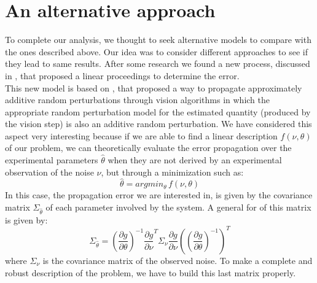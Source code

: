 \section{An alternative approach}

To complete our analysis, we thought to seek alternative models to compare with the ones described above. Our idea was to consider different approaches to see if they lead to same results. After some research we found a new process, discussed in \cite{7520324}, that proposed a linear proceedings to determine the error. \\

This new model is based on \cite{576335}, that proposed a way to propagate approximately additive random perturbations through vision algorithms in which the appropriate random perturbation model for the estimated quantity (produced by the vision step) is also an additive random perturbation. We have considered this aspect very interesting because if we are able to find a linear description $f(\nu, \theta)$ of our problem, we can theoretically evaluate the error propagation over the experimental parameters $\hat{\theta}$ when they are not derived by an experimental observation of the noise $\nu$, but through a minimization such as:
  \begin{equation*}
    \hat{\theta} = argmin_{\theta} \, f(\nu, \theta)
  \end{equation*}
In this case, the propagation error we are interested in, is given by the covariance matrix $\Sigma_{\hat{\theta}}$ of each parameter involved by the system. A general for of this matrix is given by:
  \begin{equation*}
    \Sigma_{\hat{\theta}} =
      \left( \frac{\partial g}{\partial \theta} \right)^{-1}
      \frac{\partial g}{\partial \nu}^T
      \Sigma_\nu
      \frac{\partial g}{\partial \nu}
      \left(\left( \frac{\partial g}{\partial \theta} \right)^{-1}\right)^T
  \end{equation*}
where $\Sigma_\nu$ is the covariance matrix of the observed noise. To make a complete and robust description of the problem, we have to build this last matrix properly.

